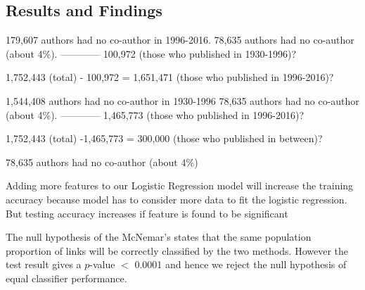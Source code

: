 \subsection{Results and Findings}

    179,607 authors had no co-author in 1996-2016. 
    78,635 authors had no co-author (about 4\%). 
    ------------
    100,972 (those who published in 1930-1996)?
    
    1,752,443 (total) - 100,972 = 1,651,471 (those who published in 1996-2016)?
    
    1,544,408 authors had no co-author in 1930-1996
    78,635 authors had no co-author (about 4\%). 
    ------------
    1,465,773 (those who published in 1996-2016)?

    1,752,443 (total) -1,465,773 = 300,000 (those who published in between)?
    
    
78,635 authors had no co-author (about 4\%)

Adding more features to our Logistic Regression model will increase the training accuracy because model has to consider more data to fit the logistic regression. But testing accuracy increases if feature is found to be significant

The null hypothesis of the McNemar's states that the same population proportion of links will be correctly classified by the two methods. However the test result gives a $p$-value $<$ 0.0001 and hence we reject the null hypothesis of equal classifier performance.

